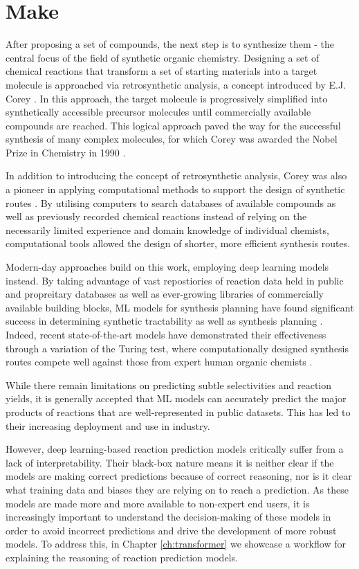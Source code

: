\section*{Make}
After proposing a set of compounds, the next step is to synthesize them - the central focus of the field of synthetic organic chemistry. Designing a set of chemical reactions that transform a set of starting materials into a target molecule is approached via retrosynthetic analysis, a concept introduced by E.J. Corey \cite{corey1991logic}. In this approach, the target molecule is progressively simplified into synthetically accessible precursor molecules until commercially available compounds are reached. This logical approach paved the way for the successful synthesis of many complex molecules, for which Corey was awarded the Nobel Prize in Chemistry in 1990 \cite{NobelCorey}.

In addition to introducing the concept of retrosynthetic analysis, Corey was also a pioneer in applying computational methods to support the design of synthetic routes \cite{Corey1985ComputerAssistedSynthesis}. By utilising computers to search databases of available compounds as well as previously recorded chemical reactions instead of relying on the necessarily limited experience and domain knowledge of individual chemists, computational tools allowed the design of shorter, more efficient synthesis routes.

Modern-day approaches build on this work, employing deep learning models instead. By taking advantage of vast repostiories of reaction data held in public and propreitary databases as well as ever-growing libraries of commercially available building blocks, ML models for synthesis planning have found significant success in determining synthetic tractability as well as synthesis planning \cite{Coley2018}. Indeed, recent state-of-the-art models have demonstrated their effectiveness through a variation of the Turing test, where computationally designed synthesis routes compete well against those from expert human organic chemists \cite{Coley19WLDN5}.

While there remain limitations on predicting subtle selectivities and reaction yields, it is generally accepted that ML models can accurately predict the major products of reactions that are well-represented in public datasets. This has led to their increasing deployment and use in industry.

However, deep learning-based reaction prediction models critically suffer from a lack of interpretability. Their black-box nature means it is neither clear if the models are making correct predictions because of correct reasoning, nor is it clear what training data and biases they are relying on to reach a prediction. As these models are made more and more available to non-expert end users, it is increasingly important to understand the decision-making of these models in order to avoid incorrect predictions and drive the development of more robust models. To address this, in Chapter \ref{ch:transformer} we showcase a workflow for explaining the reasoning of reaction prediction models.

